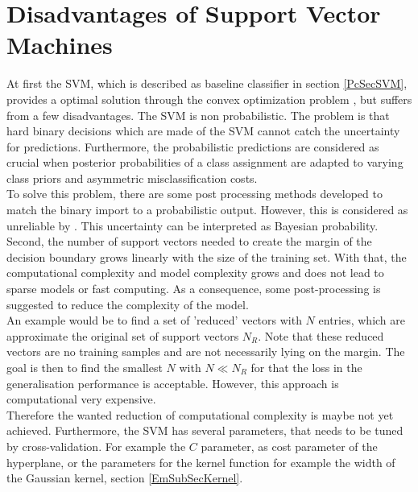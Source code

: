 \section{Disadvantages of Support Vector Machines}\label{PcSecIdea}
At first the \acs{SVM}, which is described as baseline classifier in section \ref{PcSecSVM}, provides a optimal solution through the convex optimization problem \cite[p. 325]{Bishop.2009}, but suffers from a few disadvantages.\newline
The \acs{SVM} is non probabilistic.
The problem is that hard binary decisions which are made of the \acs{SVM} cannot catch the uncertainty for predictions.
Furthermore, the probabilistic predictions are considered as crucial when posterior probabilities of a class assignment are adapted to varying class priors and asymmetric misclassification costs.\cite[p. 239-240]{Tipping.2001}\\
To solve this problem, there are some post processing methods developed to match the binary import to a probabilistic output.
However, this is considered as unreliable by \cite[p. 239-240]{Tipping.2001}. 
This uncertainty can be interpreted as Bayesian probability.\cite[p. 21]{Bishop.2009}\newline 
Second, the number of support vectors needed to create the margin of the decision boundary grows linearly with the size of the training set.
With that, the computational complexity and model complexity grows and does not lead to sparse models or fast computing.
As a consequence, some post-processing is suggested to reduce the complexity of the model.\cite{Chen.2009}\\
An example would be to find a set of 'reduced' vectors with $N$ entries, which are approximate the original set of support vectors $N_R$.
Note that these reduced vectors are no training samples and are not necessarily lying on the margin.
The goal is then to find the smallest $N$ with $N \ll N_R$ for that the loss in the generalisation performance is acceptable.
However, this approach is computational very expensive.\cite{Burges.1997}\\
Therefore the wanted reduction of computational complexity is maybe not yet achieved.\newline
Furthermore, the \ac{SVM} has several parameters, that needs to be tuned by cross-validation.
For example the $C$ parameter, as cost parameter of the hyperplane\cite[p. 420]{TrevorHastie.2009}, or the parameters for the kernel function for example the width of the Gaussian kernel, section \ref{EmSubSecKernel}.

